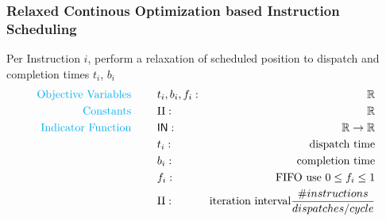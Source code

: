 \documentclass{beamer}
\begin{document}
\begin{frame}[fragile]
    \frametitle{Relaxed Continous Optimization based Instruction Scheduling}   
    Per Instruction $i$, perform a relaxation of scheduled position to dispatch and completion times $t_i$, $b_i$
    \begin{align*}
    \text{\color{cyan} Objective Variables \qquad} & t_i, b_i, f_i:& \mathbb{R} \\
    \text{\color{cyan} Constants \qquad} & \textrm{II} :& \mathbb{R} \\
    \text{\color{cyan} Indicator Function \qquad} & \mathsf{IN} :& \mathbb{R} \rightarrow \mathbb{R} \\
    & t_i :& \text{dispatch time} \\
    & b_i :& \text{completion time} \\
    & f_i :& \text{FIFO use } 0 \leq f_i \leq 1 \\
    & \textrm{II} :& \text{iteration interval} \frac{\# instructions}{dispatches/cycle} \\
    \end{align*}
\end{frame}
\end{document}
